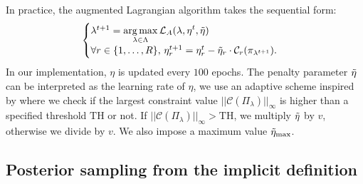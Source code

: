     In practice, the augmented Lagrangian algorithm takes the sequential form: 
    \begin{equation}
       \begin{cases}
        \lambda^{t+1} = \displaystyle\operatorname*{arg\,max}_{\lambda\in\Lambda} \mathcal{L}_A(\lambda, \eta^t, \Tilde{\eta}) \\
        \forall r \in \{1, \ldots, R\}, \, \eta_r^{t+1} = \eta_r^t - \Tilde{\eta}_r\cdot \mathcal{C}_r(\pi_{\lambda^{t+1}}).
    \end{cases}
\end{equation}
    In our implementation, $\eta$ is updated every $100$ epochs. The penalty parameter $\Tilde{\eta}$ can be interpreted as the learning rate of $\eta$, we use an adaptive scheme  inspired by \cite{basir_adaptive_2023} where we check if the largest constraint value $|| \mathcal{C}(\varPi_{\lambda}) ||_{\infty}$ is higher than a specified threshold $\mathrm{TH}$ or not. If $|| \mathcal{C}(\varPi_{\lambda}) ||_{\infty} > \mathrm{TH}$, we multiply $\Tilde{\eta}$ by $v$, otherwise we divide by $v$. We also impose a maximum value $\Tilde{\eta}_{\mathrm{max}}$.
    






\subsection{Posterior sampling from the implicit definition}\label{sec:VARP:postsampling}


